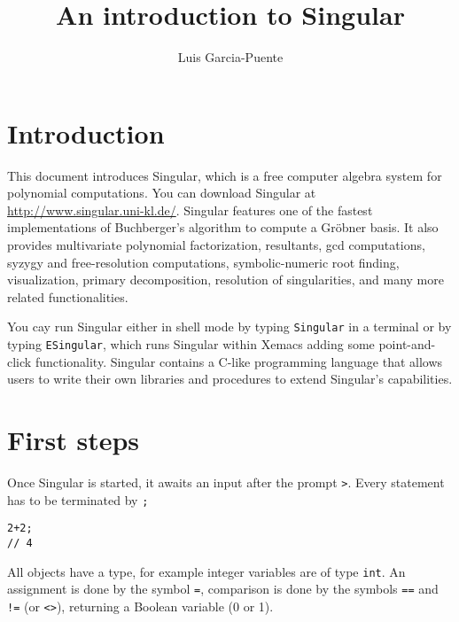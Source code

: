 \documentclass[12pt]{amsart}
\begin{document}
\title{An introduction to Singular}

\author{Luis Garcia-Puente}
\address{Department of Mathematics\\
         Texas A\&M University\\
         College Station\\
         TX \ 77843-3368\\
         USA}

\maketitle

\section*{Introduction}

This document introduces Singular, which is a free computer algebra
system for polynomial computations. You can download Singular
at \url{http://www.singular.uni-kl.de/}. Singular features one 
of the fastest implementations of Buchberger's algorithm to compute
a Gr\"obner basis. It also provides multivariate polynomial factorization,
resultants, gcd computations, syzygy and free-resolution computations, 
symbolic-numeric root finding, visualization, primary decomposition, resolution of singularities,
and many more related functionalities.

You cay run Singular either in shell mode by typing \texttt{Singular} in a terminal or by typing
\texttt{ESingular}, which runs Singular within Xemacs adding some point-and-click functionality.
Singular contains a C-like programming language that allows users to write their own libraries and
procedures to extend Singular's capabilities.


\section{First steps}

Once Singular is started, it awaits an input after the prompt \verb+>+. Every statement has to be terminated by \verb+;+

\begin{verbatim}
2+2;
// 4
\end{verbatim}

All objects have a type, for example integer variables are of type \texttt{int}. An assignment is done by the 
symbol \verb+=+, comparison is done by the symbols \verb+==+ and \verb+!=+ (or \verb+<>+), returning a Boolean variable (0 or 1).
\end{document}
